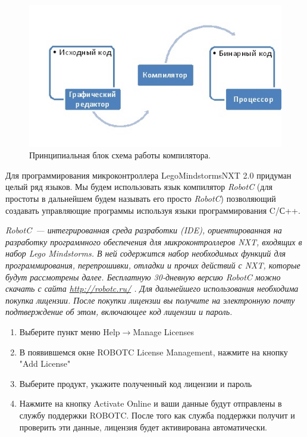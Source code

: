 \begin{figure}[h!]
	\begin{center}
		\includegraphics[width=0.75\linewidth]{chapters/chapter9/images/1}
		\caption{Принципиальная блок схема работы компилятора.}
		\label{ris:image9x1}
	\end{center}
\end{figure}

Для программирования микроконтроллера LegoMindstormsNXT 2.0 придуман целый ряд языков. Мы будем использовать язык компилятор {\slshape RobotC}  (для простоты в дальнейшем будем называть его просто {\slshape RobotC}) позволяющий создавать управляющие программы используя языки программирования C/С++.

{\slshape RobotC~--- интегрированная среда разработки (IDE), ориентированная на разработку программного обеспечения для микроконтроллеров NXT, входящих в набор Lego Mindstorms. В ней содержится набор необходимых функций для программирования, перепрошивки, отладки  и прочих действий с NXT, которые будут рассмотрены далее.
Бесплатную 30-дневную версию RobotC можно скачать с сайта \href{http://robotc.ru/}{http://robotc.ru/} . Для дальнейшего использования необходима покупка лицензии. После покупки лицензии вы получите на электронную почту подтверждение об этом, включающее код лицензии и пароль.

\begin{enumerate}
	\item Выберите пункт меню Help\(\to\)Manage Licenses
	\item В появившемся окне ROBOTC License Management, нажмите на кнопку "Add License"
	\item Выберите продукт, укажите полученный код лицензии и пароль
	\item Нажмите на кнопку Activate Online и ваши данные будут отправлены в службу поддержки ROBOTC. После того как служба поддержки получит и проверить эти данные, лицензия будет активирована автоматически.
\end{enumerate}}

